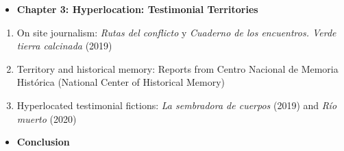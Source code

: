 \documentclass[
  11pt,
,
onecolumn,
openany
]{book}
\providecommand{\tightlist}{%
  \setlength{\itemsep}{0pt}\setlength{\parskip}{0pt}}
\begin{document}
\begin{itemize}
\tightlist
\item
  \textbf{Chapter 3: Hyperlocation: Testimonial Territories}
\end{itemize}

\begin{enumerate}
\def\labelenumi{\arabic{enumi}.}
\item
  On site journalism: \emph{Rutas del conflicto} y \emph{Cuaderno de los
  encuentros. Verde tierra calcinada} (2019)\emph{~}
\item
  Territory and historical memory: Reports from Centro Nacional de Memoria
  Histórica (National Center of Historical Memory)
\item
  Hyperlocated testimonial fictions: \emph{La sembradora de cuerpos} (2019)
  and \emph{Río muerto} (2020)
\end{enumerate}

\begin{itemize}
\tightlist
\item
  \textbf{Conclusion}
\end{itemize}
\end{document}
